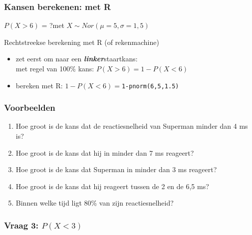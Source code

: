 \documentclass[aspectratio=169]{beamer}
\begin{document}
\begin{frame}
  \frametitle{Kansen berekenen: met R}
  
  $P( X > 6)$ = ?\hspace{1cm}met $X \sim Nor(\mu=5,\sigma=1,5)$

  Rechtstreekse berekening met R (of rekenmachine)
  
  \begin{itemize}
  \pause
  \item zet eerst om naar een \textbf{\textit{linker}}staartkans:\\
  met regel van 100\% kans: $P(X>6)=1-P(X<6)$
  \item bereken met R: $1-P(X<6)=$\texttt{1-pnorm(6,5,1.5)}
\end{itemize}
\end{frame}

\begin{frame}
  \frametitle{Voorbeelden}

  \begin{enumerate}
    \item Hoe groot is de kans dat de reactiesnelheid van Superman minder dan 4 ms is?
    \item Hoe groot is de kans dat hij in minder dan 7 ms reageert?
    \item Hoe groot is de kans dat Superman in minder dan 3 ms reageert?
    \item Hoe groot is de kans dat hij reageert tussen de 2 en de 6,5 ms?
    \item Binnen welke tijd ligt 80\% van zijn reactiesnelheid?
  \end{enumerate}
\end{frame}

\begin{frame}
  \frametitle{Vraag 3: $P(X<3)$}

\begin{center}
\end{center}
\end{frame}
\end{document}
